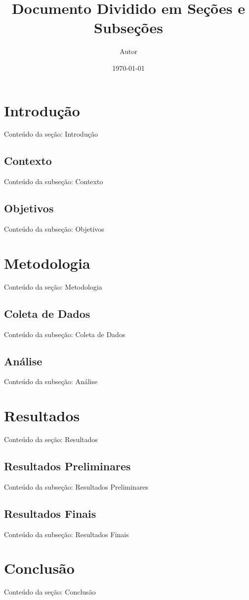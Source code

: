 \documentclass{article}
\title{Documento Dividido em Seções e Subseções}
\author{Autor}
\date{\today}
\begin{document}
\maketitle

\tableofcontents


\section{Introdução}
Conteúdo da seção: Introdução


\subsection{Contexto}
Conteúdo da subseção: Contexto


\subsection{Objetivos}
Conteúdo da subseção: Objetivos


\section{Metodologia}
Conteúdo da seção: Metodologia


\subsection{Coleta de Dados}
Conteúdo da subseção: Coleta de Dados


\subsection{Análise}
Conteúdo da subseção: Análise


\section{Resultados}
Conteúdo da seção: Resultados


\subsection{Resultados Preliminares}
Conteúdo da subseção: Resultados Preliminares


\subsection{Resultados Finais}
Conteúdo da subseção: Resultados Finais


\section{Conclusão}
Conteúdo da seção: Conclusão
\end{document}
